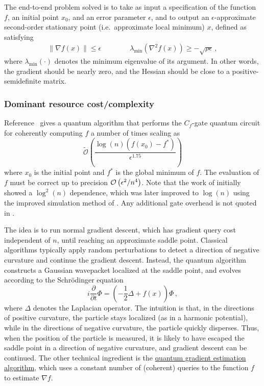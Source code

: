 \begin{refsection}
The end-to-end problem solved is to take as input a specification of the function $f$, an initial point $x_0$, and an error parameter $\epsilon$, and to output an $\epsilon$-approximate second-order stationary point (i.e.~approximate local minimum) $x$, defined as satisfying 
\begin{align}
    \lVert \nabla f(x) \rVert \leq \epsilon \qquad \qquad \lambda_{\min}(\nabla^2 f(x)) \geq -\sqrt{\rho \epsilon}\,,
\end{align}
where $\lambda_{\min}(\cdot)$ denotes the minimum eigenvalue of its argument. In other words, the gradient should be nearly zero, and the Hessian should be close to a positive-semidefinite matrix. 


\subsubsection*{Dominant resource cost/complexity}

Reference~\cite{zhang2021escapingSaddlePoints} gives a quantum algorithm that performs the $C_f$-gate quantum circuit for coherently computing $f$ a number of times scaling as
\begin{equation}
   \tilde{\mathcal{O}}\left(\frac{\log(n)(f(x_0)-f^*)}{\epsilon^{1.75}}\right)
\end{equation}
where $x_0$ is the initial point and $f^*$ is the global minimum of $f$. The evaluation of $f$ must be correct up to precision $\mathcal{O}\left( \epsilon^2/n^4 \right)$. Note that the work of \cite{zhang2021escapingSaddlePoints} initially showed a $\log^2(n)$ dependence, which was later improved to $\log(n)$ using the improved simulation method of \cite{childs2022quantumsimulationof}. Any additional gate overhead is not quoted in \cite{zhang2021escapingSaddlePoints}. 

The idea is to run normal gradient descent, which has gradient query cost independent of $n$, until reaching an approximate saddle point.  Classical algorithms typically apply random perturbations to detect a direction of negative curvature and continue the gradient descent. Instead, the quantum algorithm constructs a Gaussian wavepacket localized at the saddle point, and evolves according to the Schr\"odinger equation
\begin{equation}\label{eq:nonconvex_Ham}
    i\frac{\partial}{\partial t}\Phi = \left(-\frac{1}{2}\Delta + f(x)\right)\Phi\,,
\end{equation}
where $\Delta$ denotes the Laplacian operator. The intuition is that, in the directions of positive curvature, the particle stays localized (as in a harmonic potential), while in the directions of negative curvature, the particle quickly disperses. Thus, when the position of the particle is measured, it is likely to have escaped the saddle point in a direction of negative curvature, and gradient descent can be continued. The other technical ingredient is the \hyperref[prim:GradientEstimation]{quantum gradient estimation algorithm}, which uses a constant number of (coherent) queries to the function $f$ to estimate $\nabla f$. 


\end{refsection}
